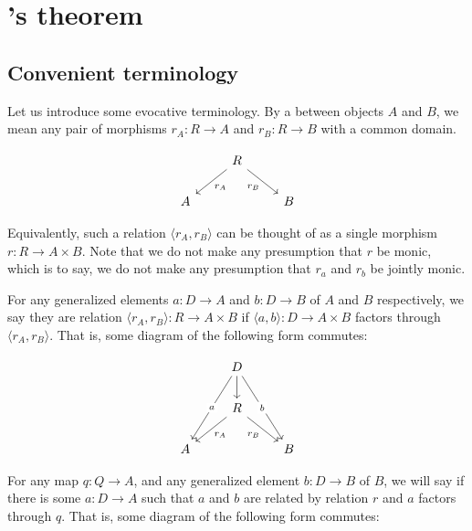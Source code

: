 \filestart

\section{\Loeb's theorem}

\subsection{Convenient terminology}
Let us introduce some evocative terminology. By a  between objects $A$ and $B$, we mean any pair of morphisms $r_A : R \to A$ and $r_B : R \to B$ with a common domain.

\[\begin{tikzcd}
	& R \\
	A && B
	\arrow["{r_A}", from=1-2, to=2-1]
	\arrow["{r_B}"', from=1-2, to=2-3]
\end{tikzcd}\]

Equivalently, such a relation $\langle r_A, r_B \rangle$ can be thought of as a single morphism $r : R \to A \times B$. Note that we do not make any presumption that $r$ be monic, which is to say, we do not make any presumption that $r_a$ and $r_b$ be jointly monic.

For any generalized elements $a : D \to A$ and $b : D \to B$ of $A$ and $B$ respectively, we say they are  relation $\langle r_A, r_B \rangle: R \to A \times B$ if $\langle a, b \rangle : D \to A \times B$ factors through $\langle r_A, r_B \rangle$. That is, some diagram of the following form commutes:

\[\begin{tikzcd}
	& D \\
	& R \\
	A && B
	\arrow["{r_A}", from=2-2, to=3-1]
	\arrow["{r_B}"', from=2-2, to=3-3]
	\arrow[from=1-2, to=2-2]
	\arrow["a"{description}, from=1-2, to=3-1]
	\arrow["b"{description}, from=1-2, to=3-3]
\end{tikzcd}\]

For any map $q: Q \to A$, and any generalized element $b : D \to B$ of $B$, we will say  if there is some $a : D \to A$ such that $a$ and $b$ are related by relation $r$ and $a$ factors through $q$. That is, some diagram of the following form commutes:

